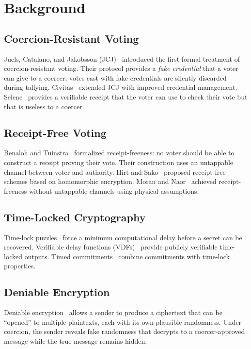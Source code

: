 \documentclass[11pt,a4paper]{article}
\begin{document}
\section{Background}

\subsection{Coercion-Resistant Voting}

Juels, Catalano, and Jakobsson (JCJ)~\citep{juels2005coercion} introduced the first formal treatment of coercion-resistant voting. Their protocol provides a \emph{fake credential} that a voter can give to a coercer; votes cast with fake credentials are silently discarded during tallying. Civitas~\citep{clarkson2008civitas} extended JCJ with improved credential management. Selene~\citep{ryan2016selene} provides a verifiable receipt that the voter can use to check their vote but that is useless to a coercer.

\subsection{Receipt-Free Voting}

Benaloh and Tuinstra~\citep{benaloh1994receipt} formalized receipt-freeness: no voter should be able to construct a receipt proving their vote. Their construction uses an untappable channel between voter and authority. Hirt and Sako~\citep{hirt2000receipt} proposed receipt-free schemes based on homomorphic encryption. Moran and Naor~\citep{moran2006receipt} achieved receipt-freeness without untappable channels using physical assumptions.

\subsection{Time-Locked Cryptography}

Time-lock puzzles~\citep{rivest1996time} force a minimum computational delay before a secret can be recovered. Verifiable delay functions (VDFs)~\citep{boneh2018verifiable} provide publicly verifiable time-locked outputs. Timed commitments~\citep{boneh2000timed} combine commitments with time-lock properties.

\subsection{Deniable Encryption}

Deniable encryption~\citep{canetti1997deniable} allows a sender to produce a ciphertext that can be ``opened'' to multiple plaintexts, each with its own plausible randomness. Under coercion, the sender reveals fake randomness that decrypts to a coercer-approved message while the true message remains hidden.
\end{document}
